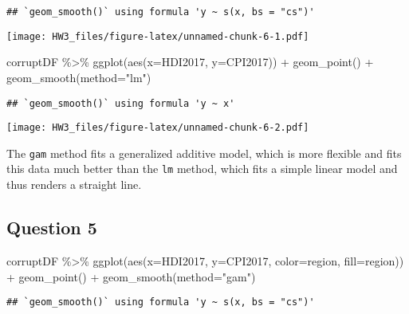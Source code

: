 \documentclass[
]{article}
\newenvironment{Shaded}{\begin{snugshade}}{\end{snugshade}}
\newcommand{\AttributeTok}[1]{\textcolor[rgb]{0.77,0.63,0.00}{#1}}
\newcommand{\FunctionTok}[1]{\textcolor[rgb]{0.00,0.00,0.00}{#1}}
\newcommand{\NormalTok}[1]{#1}
\newcommand{\SpecialCharTok}[1]{\textcolor[rgb]{0.00,0.00,0.00}{#1}}
\newcommand{\StringTok}[1]{\textcolor[rgb]{0.31,0.60,0.02}{#1}}
\begin{document}
\begin{verbatim}
## `geom_smooth()` using formula 'y ~ s(x, bs = "cs")'
\end{verbatim}

\texttt{[image: HW3\_files/figure-latex/unnamed-chunk-6-1.pdf]}

\begin{Shaded}
\begin{Highlighting}[]
\NormalTok{corruptDF }\SpecialCharTok{\%\textgreater{}\%} 
  \FunctionTok{ggplot}\NormalTok{(}\FunctionTok{aes}\NormalTok{(}\AttributeTok{x=}\NormalTok{HDI2017,}
             \AttributeTok{y=}\NormalTok{CPI2017)) }\SpecialCharTok{+}
  \FunctionTok{geom\_point}\NormalTok{() }\SpecialCharTok{+}
  \FunctionTok{geom\_smooth}\NormalTok{(}\AttributeTok{method=}\StringTok{"lm"}\NormalTok{)}
\end{Highlighting}
\end{Shaded}

\begin{verbatim}
## `geom_smooth()` using formula 'y ~ x'
\end{verbatim}

\texttt{[image: HW3\_files/figure-latex/unnamed-chunk-6-2.pdf]}

The \texttt{gam} method fits a generalized additive model, which is more
flexible and fits this data much better than the \texttt{lm} method,
which fits a simple linear model and thus renders a straight line.

\hypertarget{question-5}{%
\subsection{Question 5}\label{question-5}}

\begin{Shaded}
\begin{Highlighting}[]
\NormalTok{corruptDF }\SpecialCharTok{\%\textgreater{}\%} 
  \FunctionTok{ggplot}\NormalTok{(}\FunctionTok{aes}\NormalTok{(}\AttributeTok{x=}\NormalTok{HDI2017,}
             \AttributeTok{y=}\NormalTok{CPI2017,}
             \AttributeTok{color=}\NormalTok{region,}
             \AttributeTok{fill=}\NormalTok{region)) }\SpecialCharTok{+}
  \FunctionTok{geom\_point}\NormalTok{() }\SpecialCharTok{+}
  \FunctionTok{geom\_smooth}\NormalTok{(}\AttributeTok{method=}\StringTok{"gam"}\NormalTok{)}
\end{Highlighting}
\end{Shaded}

\begin{verbatim}
## `geom_smooth()` using formula 'y ~ s(x, bs = "cs")'
\end{verbatim}
\end{document}
